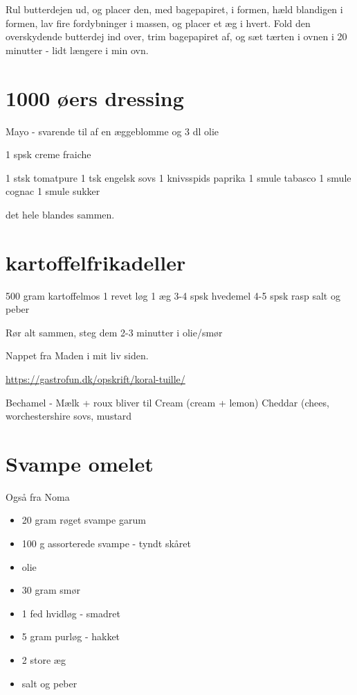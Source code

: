 \documentclass[
]{book}
\providecommand{\tightlist}{%
  \setlength{\itemsep}{0pt}\setlength{\parskip}{0pt}}
\begin{document}
Rul butterdejen ud, og placer den, med bagepapiret, i formen,
hæld blandigen i formen, lav fire fordybninger i massen, og placer
et æg i hvert. Fold den overskydende butterdej ind over, trim
bagepapiret af, og sæt tærten i ovnen i 20 minutter - lidt længere
i min ovn.

\hypertarget{uxf8ers-dressing}{%
\section{1000 øers dressing}\label{uxf8ers-dressing}}

Mayo - svarende til af en æggeblomme og 3 dl olie

1 spsk creme fraiche

1 stsk tomatpure
1 tsk engelsk sovs
1 knivsspids paprika
1 smule tabasco
1 smule cognac
1 smule sukker

det hele blandes sammen.

\hypertarget{kartoffelfrikadeller}{%
\section{kartoffelfrikadeller}\label{kartoffelfrikadeller}}

500 gram kartoffelmos
1 revet løg
1 æg
3-4 spsk hvedemel
4-5 spsk rasp
salt og peber

Rør alt sammen, steg dem 2-3 minutter i olie/smør

Nappet fra Maden i mit liv siden.

\url{https://gastrofun.dk/opskrift/koral-tuille/}

Bechamel - Mælk + roux
bliver til
Cream (cream + lemon)
Cheddar (chees, worchestershire sovs, mustard

\hypertarget{svampe-omelet}{%
\section{Svampe omelet}\label{svampe-omelet}}

Også fra Noma

\begin{itemize}
\tightlist
\item
  20 gram røget svampe garum
\item
  100 g assorterede svampe - tyndt skåret
\item
  olie
\item
  30 gram smør
\item
  1 fed hvidløg - smadret
\item
  5 gram purløg - hakket
\item
  2 store æg
\item
  salt og peber
\end{itemize}
\end{document}
